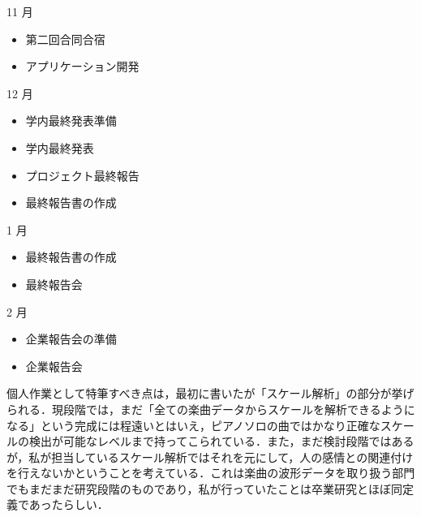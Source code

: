 11 月
\begin{itemize}
\item 第二回合同合宿
\item アプリケーション開発
\end{itemize}
12 月
\begin{itemize}
\item 学内最終発表準備
\item 学内最終発表
\item プロジェクト最終報告
\item 最終報告書の作成
\end{itemize}
1 月
\begin{itemize}
\item 最終報告書の作成
\item 最終報告会
\end{itemize}
2 月
\begin{itemize}
\item 企業報告会の準備
\item 企業報告会
\end{itemize}
個人作業として特筆すべき点は，最初に書いたが「スケール解析」の部分が挙げられる．現段階では，まだ「全ての楽曲データからスケールを解析できるようになる」という完成には程遠いとはいえ，ピアノソロの曲ではかなり正確なスケールの検出が可能なレベルまで持ってこられている．また，まだ検討段階ではあるが，私が担当しているスケール解析ではそれを元にして，人の感情との関連付けを行えないかということを考えている．これは楽曲の波形データを取り扱う部門でもまだまだ研究段階のものであり，私が行っていたことは卒業研究とほぼ同定義であったらしい．
